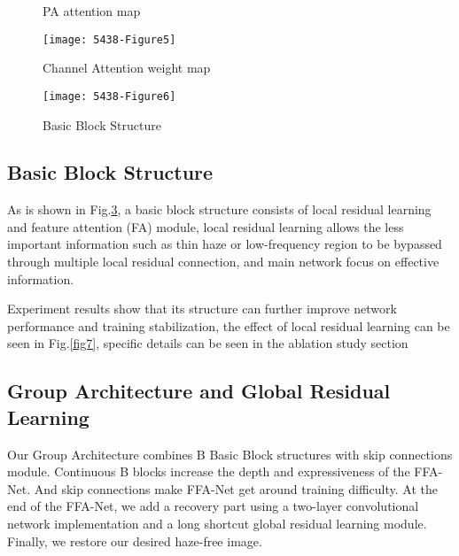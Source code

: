 \documentclass[letterpaper]{article} \usepackage{aaai20}  \usepackage{times}  \usepackage{helvet} \usepackage{courier}  \usepackage[hyphens]{url}  \usepackage{graphicx} \urlstyle{rm} \def\UrlFont{\rm}  \usepackage{graphicx}  \frenchspacing  \setlength{\pdfpagewidth}{8.5in}  \setlength{\pdfpageheight}{11in}  \usepackage{bm}
\begin{document}
\begin{figure}[t]
	\centering
	\caption{PA attention map}

	
\label{fig4}
				
\end{figure}

\begin{figure}[t]
	\centering
	\texttt{[image: 5438-Figure5]} \caption{Channel Attention weight map}
	\label{fig5}
\end{figure}
\begin{figure}[t]
	\centering
	\texttt{[image: 5438-Figure6]} \caption{ Basic Block Structure}
	\label{fig6}
\end{figure}




\subsection{Basic Block Structure}


As is shown in Fig.\ref{fig6}, a basic block structure consists of local residual learning and feature attention (FA) module, local residual learning allows the less important information such as thin haze or low-frequency region to be bypassed through multiple local residual connection, and main network focus on effective information. 

Experiment results show that its structure can further improve network performance and training stabilization, the effect of local residual learning can be seen in Fig.\ref{fig7}, specific details can be seen in the ablation study section




\subsection{Group Architecture and Global Residual Learning}
Our Group Architecture combines  B Basic Block structures with skip connections module. Continuous B blocks increase the depth and expressiveness of the FFA-Net. And skip connections make FFA-Net  get around training difficulty. 
At the end of the FFA-Net, we add a recovery part using a two-layer convolutional network implementation and a long shortcut global residual learning module. Finally, we  restore our desired haze-free image.
\end{document}
